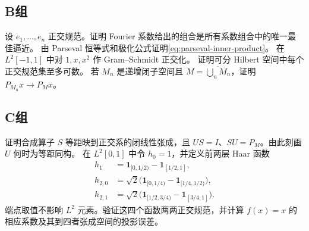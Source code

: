 \subsection*{B组}
\begin{enumerate}[label=\textbf{\thechapter.\arabic*.},resume]
设 \(e_1,\ldots,e_n\) 正交规范。证明 Fourier 系数给出的组合是所有系数组合中的唯一最佳逼近。
由 Parseval 恒等式和极化公式证明\eqref{eq:parseval-inner-product}。
在 \(L^2[-1,1]\) 中对 \(1,x,x^2\) 作 Gram--Schmidt 正交化。
证明可分 Hilbert 空间中每个正交规范集至多可数。
若 \(M_n\) 是递增闭子空间且 \(M=\overline{\bigcup_nM_n}\)，证明 \(P_{M_n}x\to P_Mx\)。
\end{enumerate}
\subsection*{C组}
\begin{enumerate}[label=\textbf{\thechapter.\arabic*.},resume]
证明合成算子 \(S\) 等距映到正交系的闭线性张成，且 \(US=I\)、\(SU=P_M\)。由此刻画 \(U\) 何时为等距同构。
在 \(L^2[0,1]\) 中令 \(h_0=1\)，并定义前两层 Haar 函数
\[
 \begin{aligned}
 h_1&=\mathbf1_{[0,1/2)}-\mathbf1_{[1/2,1]},\\
 h_{2,0}&=\sqrt2\bigl(\mathbf1_{[0,1/4)}-\mathbf1_{[1/4,1/2)}\bigr),\\
 h_{2,1}&=\sqrt2\bigl(\mathbf1_{[1/2,3/4)}-\mathbf1_{[3/4,1]}\bigr).
 \end{aligned}
\]
端点取值不影响 \(L^2\) 元素。验证这四个函数两两正交规范，并计算
\(f(x)=x\) 的相应系数及其到四者张成空间的投影误差。
\end{enumerate}
